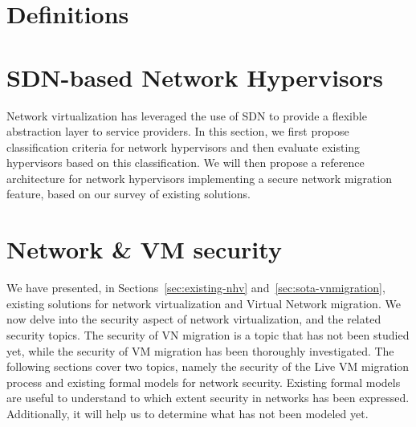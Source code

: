 \documentclass[a4paper, 11pt]{report}
\newcommand{\boxedtext}[1]{\fbox{\scriptsize\bfseries\textsf{#1}}}
\newcommand{\myremark}[2]{
   \textcolor{blue}{\boxedtext{#1}
      {\small$\blacktriangleright$\emph{\textsl{#2}}$\blacktriangleleft$}
}}
\newcommand\GB[1]{\myremark{GBAA}{#1}}
\theoremstyle{definition}
\begin{document}
\section{Definitions}
\label{sec:basic_def}


\section{SDN-based Network Hypervisors}

Network virtualization has leveraged the use of SDN to provide a flexible abstraction layer to service providers. In this section, we first propose classification criteria for network hypervisors and then evaluate existing hypervisors based on this classification. We will then propose a reference architecture for network hypervisors implementing a secure network migration feature, based on our survey of existing solutions.















\section{Network \& VM security}

We have presented, in Sections~\ref{sec:existing-nhv} and~\ref{sec:sota-vnmigration}, existing solutions for network virtualization and Virtual Network migration. We now delve into the security aspect of network virtualization, and the related security topics. The security of VN migration is a topic that has not been studied yet, while the security of VM migration has been thoroughly investigated. The following sections cover two topics, namely the security of the Live VM migration process and existing formal models for network security.
Existing formal models are useful to understand to which extent security in networks has been expressed. Additionally, it will help us to determine what has not been modeled yet.
\end{document}
